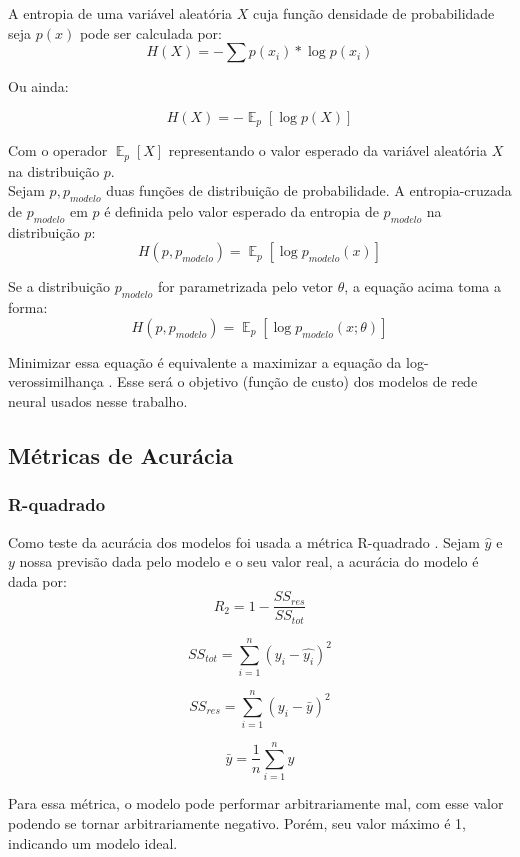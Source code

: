 A entropia de uma variável aleatória $X$ cuja função densidade
de probabilidade seja $p(x)$ pode ser calculada por: \\

\[ H(X)  = - \sum p(x_i)*\log p(x_i) \]

Ou ainda:

\[H(X) = - \mathop{\mathbb{E}}_p[\log p(X)] \]

Com o operador $\mathop{\mathbb{E}}_p[X]$ representando o valor esperado da
variável aleatória $X$ na distribuição $p$. \\

Sejam $p,p_{modelo}$ duas funções de distribuição de probabilidade. A entropia-cruzada de $p_{modelo}$ em $p$ é definida pelo valor
esperado da entropia de $p_{modelo}$ na distribuição $p$: \\

\[H(p,p_{modelo}) =  \mathop{\mathbb{E}}_p[\log p_{modelo}(x)] \]

Se a distribuição $p_{modelo}$ for parametrizada pelo vetor $\theta$, a equação
acima toma a forma: \\


\[H(p,p_{modelo}) =  \mathop{\mathbb{E}}_p[\log p_{modelo}(x ; \theta)] \]

Minimizar essa equação é equivalente a maximizar a equação da
log-verossimilhança \citep{dlbook}. Esse será o objetivo (função de custo) dos modelos de rede neural usados
nesse trabalho.  

\subsection{Métricas de Acurácia}

\subsubsection{R-quadrado}
Como teste da acurácia dos modelos foi usada a métrica R-quadrado \citep{cohen}. Sejam $\hat{y}$ e $y$ nossa previsão dada pelo modelo e o seu valor real, a acurácia do modelo é dada por:\\

\[R_2 = 1 - \frac{SS_{res}}{SS_{tot}}\]

\[SS_{tot} = \sum^n_{i=1} (y_i- \hat{y_i})^2\]

\[SS_{res} = \sum^n_{i=1} (y_i - \bar{y})^2\]

\[ \bar{y} = \frac{1}{n} \sum^n_{i=1} y\]

Para essa métrica, o modelo pode performar arbitrariamente mal, com esse valor
podendo se tornar arbitrariamente negativo. Porém, seu valor máximo é 1,
indicando um modelo ideal.\\


